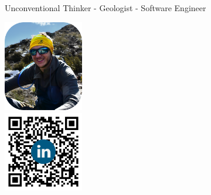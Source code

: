 \documentclass[]{friggeri-cv}
\begin{document}
      {\hspace{5.05cm}Unconventional Thinker - Geologist - Software Engineer}
      

\begin{aside}
  \includegraphics[width=3.5cm]{img/profile_relaxed.png}
  ~\\[6pt]	
  \includegraphics[width=3.5cm]{img/QR.png}
  ~
\end{aside}
\end{document}
